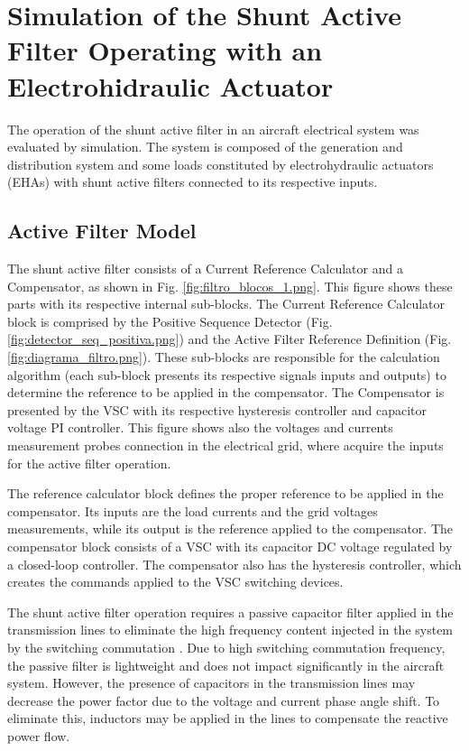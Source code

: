\section{Simulation of the Shunt Active Filter Operating with an Electrohidraulic Actuator}

The operation of the shunt active filter in an aircraft electrical system was evaluated by simulation. The system is composed of the generation and distribution system and some loads constituted by electrohydraulic actuators (EHAs) with shunt active filters connected to its respective inputs.

\subsection{Active Filter Model}

The shunt active filter consists of a Current Reference Calculator and a Compensator, as shown in Fig. \ref{fig:filtro_blocos_1.png}. This figure shows these parts with its respective internal sub-blocks. The Current Reference Calculator block is comprised by the Positive Sequence Detector (Fig. \ref{fig:detector_seq_positiva.png}) and the Active Filter Reference Definition (Fig. \ref{fig:diagrama_filtro.png}). These sub-blocks are responsible for the calculation algorithm (each sub-block presents its respective signals inputs and outputs) to determine the reference to be applied in the compensator. The Compensator is presented by the VSC with its respective hysteresis controller and capacitor voltage PI controller. This figure shows also the voltages and currents measurement probes connection in the electrical grid, where acquire the inputs for the active filter operation.

The reference calculator block defines the proper reference to be applied in the compensator. Its inputs are the load currents and the grid voltages measurements, while its output is the reference applied to the compensator. The compensator block consists of a VSC with its capacitor DC voltage regulated by a closed-loop controller. The compensator also has the hysteresis controller, which creates the commands applied to the VSC switching devices.

The shunt active filter operation requires a passive capacitor filter applied in the transmission lines to eliminate the high frequency content injected in the system by the switching commutation \citep{Akagi2007}. Due to high switching commutation frequency, the passive filter is lightweight and does not impact significantly in the aircraft system. However, the presence of capacitors in the transmission lines may decrease the power factor due to the voltage and current phase angle shift. To eliminate this, inductors may be applied in the lines to compensate the reactive power flow.

